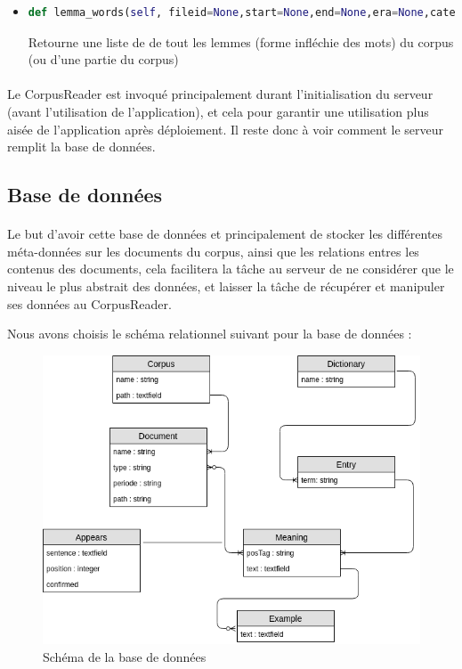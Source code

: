 \documentclass[]{report}
\begin{document}
\begin{itemize}
				\item 
				\begin{lstlisting}[language=python]
				def lemma_words(self, fileid=None,start=None,end=None,era=None,category=None):\end{lstlisting}
				Retourne une liste de de tout les lemmes (forme infléchie des mots) du corpus (ou d'une partie du corpus) 
				
				
			\end{itemize}
			\paragraph{}
			Le CorpusReader est invoqué principalement durant l'initialisation du serveur (avant l'utilisation de l'application), et cela pour garantir une utilisation plus aisée de l'application après déploiement. Il reste donc à voir comment le serveur remplit la base de données. 
		\subsection{Base de données}
			\paragraph{}
			Le but d'avoir cette base de données et principalement de stocker les différentes méta-données sur les documents du corpus, ainsi que les relations entres les contenus des documents, cela facilitera la tâche au serveur de ne considérer que le niveau le plus abstrait des données, et laisser la tâche de récupérer et manipuler ses données au CorpusReader.
			\par 
			Nous avons choisis le schéma relationnel suivant pour la base de données : 
			
			\begin{figure}[H]
				\centering
				\includegraphics[width=0.65\linewidth]{images/db_schema.png}
				\caption{Schéma de la base de données }
			\end{figure}
		
\end{document}
